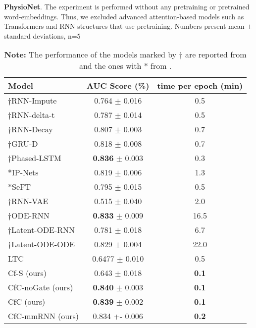 \documentclass[12pt]{article}
\begin{document}
\begin{table}[t]
    \centering
    \caption{\textbf{PhysioNet}. The experiment is performed without any pretraining or pretrained word-embeddings. Thus, we excluded advanced attention-based models \cite{shukla2021multi,ad-trans2021} such as Transformers \cite{vaswani2017attention} and RNN structures that use pretraining. Numbers present mean $\pm$ standard deviations, n=5}
    \begin{tabular}{lcc}
    \toprule
         Model & AUC Score (\%) & time per epoch (min) \\\hline
         ${\dagger}$RNN-Impute \cite{rubanova2019latent}& 0.764 $\pm$ 0.016 & 0.5 \\
         ${\dagger}$RNN-delta-t \cite{rubanova2019latent} & 0.787 $\pm$ 0.014 & 0.5  \\
         ${\dagger}$RNN-Decay \cite{rubanova2019latent} & 0.807 $\pm$ 0.003 & 0.7 \\
         ${\dagger}$GRU-D \cite{che2018recurrent} & 0.818 $\pm$ 0.008 & 0.7 \\
         ${\dagger}$Phased-LSTM \cite{neil2016phased} & \textbf{0.836} $\pm$ 0.003 & 0.3 \\
         $\ast$IP-Nets \cite{shukla2018interpolation} & 0.819 $\pm$ 0.006 & 1.3 \\
         $\ast$SeFT \cite{horn2020set} & 0.795 $\pm$ 0.015 & 0.5 \\
         ${\dagger}$RNN-VAE \cite{rubanova2019latent} & 0.515 $\pm$ 0.040 & 2.0 \\
         ${\dagger}$ODE-RNN \cite{rubanova2019latent} & \textbf{0.833} $\pm$ 0.009 & 16.5 \\
         ${\dagger}$Latent-ODE-RNN \cite{rubanova2019latent} & 0.781 $\pm$ 0.018 & 6.7 \\
         ${\dagger}$Latent-ODE-ODE \cite{rubanova2019latent} & 0.829 $\pm$ 0.004 & 22.0 \\
         LTC \cite{hasani2021liquid} & 0.6477 $\pm$ 0.010 & 0.5 \\
         \hline
         Cf-S (ours) & 0.643 $\pm$ 0.018 & \textbf{0.1} \\
         CfC-noGate (ours) & \textbf{0.840} $\pm$ 0.003 & \textbf{0.1} \\
         CfC (ours) & \textbf{0.839} $\pm$ 0.002 & \textbf{0.1}  \\
         CfC-mmRNN (ours) & 0.834 +- 0.006 & \textbf{0.2} \\
         \bottomrule
    \end{tabular}
    \caption*{\footnotesize \textbf{Note:} The performance of the models marked by $\dagger$ are reported from  \cite{rubanova2019latent} and the ones with  $\ast$ from \cite{shukla2021multi}.}
    \label{tab:physionet}
\end{table}
\end{document}

